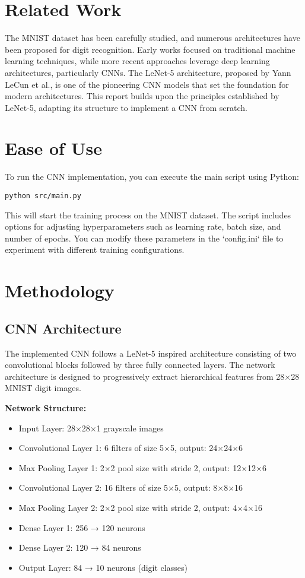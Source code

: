 \documentclass[conference]{IEEEtran}
\begin{document}
\section{Related Work}
The MNIST dataset has been carefully studied, and numerous architectures have been proposed for digit recognition. Early works focused on traditional machine learning techniques, while more recent approaches leverage deep learning architectures, particularly CNNs. The LeNet-5 architecture, proposed by Yann LeCun et al., is one of the pioneering CNN models that set the foundation for modern architectures. This report builds upon the principles established by LeNet-5, adapting its structure to implement a CNN from scratch.

\section{Ease of Use}

To run the CNN implementation, you can execute the main script using Python:
\begin{verbatim}
python src/main.py
\end{verbatim}
This will start the training process on the MNIST dataset. The script includes options for adjusting hyperparameters such as learning rate, batch size, and number of epochs. You can modify these parameters in the `config.ini` file to experiment with different training configurations.

\section{Methodology}
\subsection{CNN Architecture}
The implemented CNN follows a LeNet-5 inspired architecture consisting of two convolutional blocks followed by three fully connected layers. The network architecture is designed to progressively extract hierarchical features from 28×28 MNIST digit images.

\textbf{Network Structure:}
\begin{itemize}
\item Input Layer: 28×28×1 grayscale images
\item Convolutional Layer 1: 6 filters of size 5×5, output: 24×24×6
\item Max Pooling Layer 1: 2×2 pool size with stride 2, output: 12×12×6
\item Convolutional Layer 2: 16 filters of size 5×5, output: 8×8×16
\item Max Pooling Layer 2: 2×2 pool size with stride 2, output: 4×4×16
\item Dense Layer 1: 256 → 120 neurons
\item Dense Layer 2: 120 → 84 neurons
\item Output Layer: 84 → 10 neurons (digit classes)
\end{itemize}
\end{document}
